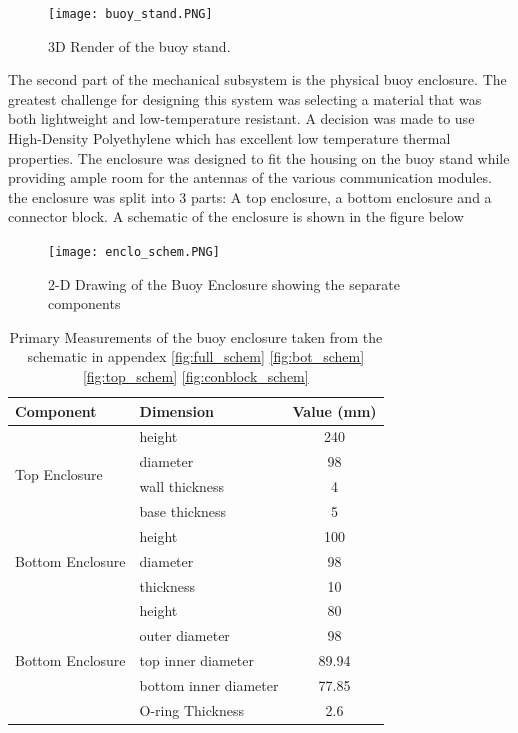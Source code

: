 \begin{figure}[H]
	\centering
	\texttt{[image: buoy\_stand.PNG]}
	\caption{3D Render of the buoy stand.}
	\label{fig:stand}
\end{figure}

The second part of the mechanical subsystem is the physical buoy enclosure. The greatest challenge for designing this system was selecting a material that was both lightweight and low-temperature resistant. A decision was made to use High-Density Polyethylene which has excellent low temperature thermal properties. The enclosure was designed to fit the housing on the buoy stand while providing ample room for the antennas of the various communication modules. the enclosure was split into 3 parts: A top enclosure, a bottom enclosure and a connector block. A schematic of the enclosure is shown in the figure below

\begin{figure}[H]
	\centering
	\texttt{[image: enclo\_schem.PNG]}
	\caption{2-D Drawing of the Buoy Enclosure showing the separate components}
	\label{fig:enclo_schem}
\end{figure}

\begin{table}[H]
	\centering
	\caption{Primary Measurements of the buoy enclosure taken from the schematic in appendex \ref{fig:full_schem} \ref{fig:bot_schem} \ref{fig:top_schem} \ref{fig:conblock_schem}}
	\begin{tabular}{||l  l c||}
		\hline
		\textbf{Component} &   \textbf{Dimension} &   \textbf{Value (mm)} \\
		\hline
		\hline
		\multirow{4}{*}{Top Enclosure} & height & 240\\
		&  diameter & 98  \\
		&  wall thickness & 4 \\ 
		& base thickness & 5 \\
		\hline
		\multirow{3}{*}{Bottom Enclosure} & height & 100\\
		&  diameter & 98  \\
		& thickness & 10 \\ 
		\hline
		\multirow{5}{*}{Bottom Enclosure} & height & 80\\
		&  outer diameter & 98  \\
		&  top inner diameter & 89.94  \\ 
		&  bottom inner diameter & 77.85\\
		&  O-ring Thickness & 2.6 \\
		\hline
	\end{tabular}
	
	\label{tab:enc_meas}
\end{table}


